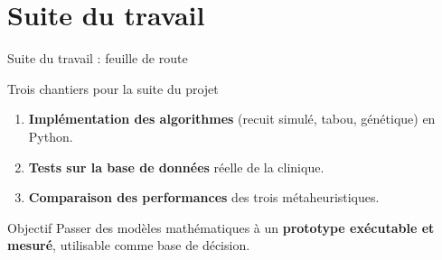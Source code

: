 \documentclass[aspectratio=169,11pt]{beamer}
\begin{document}
\section{Suite du travail}

\begin{frame}{Suite du travail : feuille de route}
  \begin{block}{Trois chantiers pour la suite du projet}
    \begin{enumerate}
      \item \textbf{Implémentation des algorithmes} (recuit simulé, tabou,
      génétique) en Python.
      \item \textbf{Tests sur la base de données} réelle de la clinique.
      \item \textbf{Comparaison des performances} des trois métaheuristiques.
    \end{enumerate}
  \end{block}
  \vspace{0.2em}
  \begin{center}
  \end{center}
  \begin{alertblock}{\footnotesize Objectif}
    \footnotesize Passer des modèles mathématiques à un \textbf{prototype
    exécutable et mesuré}, utilisable comme base de décision.
  \end{alertblock}
\end{frame}
\end{document}
